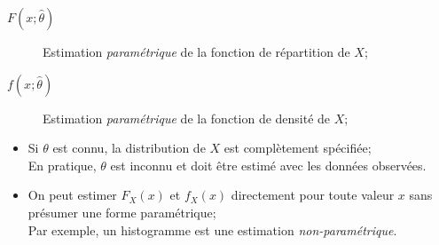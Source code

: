 \documentclass[10pt, french]{article}
\begin{document}
\begin{multicols*}{2}
\begin{distributions}[Notation]
\begin{description}
	\item[$F(x; \hat{\theta})$]	Estimation \textit{paramétrique} de la fonction de répartition de $X$;
	\item[$f(x; \hat{\theta})$]	Estimation \textit{paramétrique} de la fonction de densité de $X$;
\end{description}
\end{distributions}
\begin{itemize}[leftmargin = *]
	\item	Si $\theta$ est connu, la distribution de $X$ est complètement spécifiée;\\
			En pratique, $\theta$ est inconnu et doit être estimé avec les données observées.
	\item	On peut estimer $F_{X}(x)$ et $f_{X}(x)$ directement pour toute valeur $x$ sans présumer une forme paramétrique;\\
			Par exemple, un histogramme est une estimation \textit{non-paramétrique}.
\end{itemize}


\columnbreak

\end{multicols*}
\end{document}
